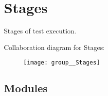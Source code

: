 \hypertarget{group__Stages}{\section{Stages}
\label{group__Stages}
}


Stages of test execution.  


Collaboration diagram for Stages\-:\nopagebreak
\begin{figure}[H]
\begin{center}
\leavevmode
\texttt{[image: group\_\_Stages]}
\end{center}
\end{figure}
\subsection*{Modules}

